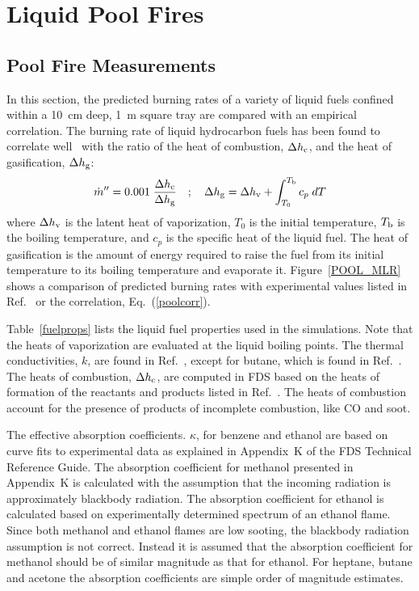 \clearpage

\section{Liquid Pool Fires}


\subsection{Pool Fire Measurements}

In this section, the predicted burning rates of a variety of liquid fuels confined within a 10~cm deep, 1~m square tray are compared with an empirical correlation. The burning rate of liquid hydrocarbon fuels has been found to correlate well~\cite{SFPE:Gottuk_and_White} with the ratio of the heat of combustion, $\Delta h_{\rm c}$, and the heat of gasification, $\Delta h_{\rm g}$:
\begin{equation}
\dot{m}''= 0.001 \; \frac{\Delta h_{\rm c}}{\Delta h_{\rm g}} \quad ; \quad \Delta h_{\rm g} = \Delta h_{\rm v} + \int_{T_0}^{T_{\rm b}} c_p \; dT
\label{poolcorr}
\end{equation}
where $\Delta h_{\rm v}$ is the latent heat of vaporization, $T_0$ is the initial temperature, $T_{\rm b}$ is the boiling temperature, and $c_p$ is the specific heat of the liquid fuel. The heat of gasification is the amount of energy required to raise the fuel from its initial temperature to its boiling temperature and evaporate it. Figure~\ref{POOL_MLR} shows a comparison of predicted burning rates with experimental values listed in Ref.~\cite{SFPE:Gottuk_and_White} or the correlation, Eq.~(\ref{poolcorr}).

Table~\ref{fuelprops} lists the liquid fuel properties used in the simulations. Note that the heats of vaporization are evaluated at the liquid boiling points. The thermal conductivities, $k$, are found in Ref.~\cite{CRCHandbook}, except for butane, which is found in Ref.~\cite{Webbook:FluidThermo}. The heats of combustion, $\Delta h_{\rm c}$, are computed in FDS based on the heats of formation of the reactants and products listed in Ref.~\cite{NIST_JANAF}. The heats of combustion account for the presence of products of incomplete combustion, like CO and soot.

The effective absorption coefficients. $\kappa$, for benzene and ethanol are based on curve fits to experimental data as explained in Appendix~K of the FDS Technical Reference Guide. The absorption coefficient for methanol presented in Appendix~K is calculated with the assumption that the incoming radiation is approximately blackbody radiation. The absorption coefficient for ethanol is calculated based on experimentally determined spectrum of an ethanol flame. Since both methanol and ethanol flames are low sooting, the blackbody radiation assumption is not correct. Instead it is assumed that the absorption coefficient for methanol should be of similar magnitude as that for ethanol. For heptane, butane and acetone the absorption coefficients are simple order of magnitude estimates.

